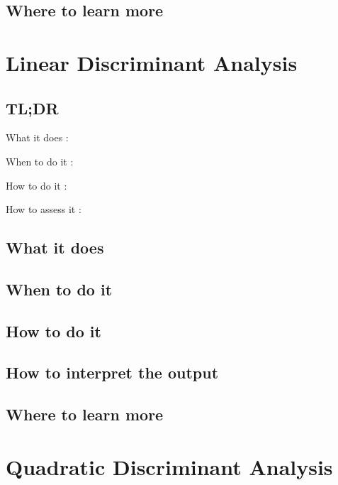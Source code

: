 \documentclass[
]{book}
\begin{document}
\hypertarget{where-to-learn-more-3}{%
\section{Where to learn more}\label{where-to-learn-more-3}}

\hypertarget{linear-discriminant-analysis}{%
\chapter{Linear Discriminant Analysis}\label{linear-discriminant-analysis}}

\hypertarget{tldr-4}{%
\section{TL;DR}\label{tldr-4}}

What it does
:

When to do it
:

How to do it
:

How to assess it
:

\hypertarget{what-it-does-4}{%
\section{What it does}\label{what-it-does-4}}

\hypertarget{when-to-do-it-4}{%
\section{When to do it}\label{when-to-do-it-4}}

\hypertarget{how-to-do-it-4}{%
\section{How to do it}\label{how-to-do-it-4}}

\hypertarget{how-to-interpret-the-output-4}{%
\section{How to interpret the output}\label{how-to-interpret-the-output-4}}

\hypertarget{where-to-learn-more-4}{%
\section{Where to learn more}\label{where-to-learn-more-4}}

\hypertarget{quadratic-discriminant-analysis}{%
\chapter{Quadratic Discriminant Analysis}\label{quadratic-discriminant-analysis}}
\end{document}
